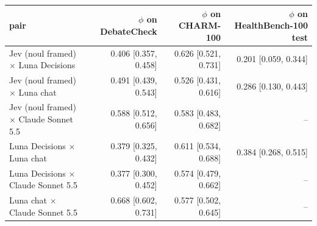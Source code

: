 \begin{tabular}{lrrr}
\toprule
pair & $\phi$ on DebateCheck & $\phi$ on CHARM-100 & $\phi$ on HealthBench-100 test \\
\midrule
Jev (noul framed) $\times$ Luna Decisions & 0.406 [0.357, 0.458] & 0.626 [0.521, 0.731] & 0.201 [0.059, 0.344] \\
Jev (noul framed) $\times$ Luna chat & 0.491 [0.439, 0.543] & 0.526 [0.431, 0.616] & 0.286 [0.130, 0.443] \\
Jev (noul framed) $\times$ Claude Sonnet 5.5 & 0.588 [0.512, 0.656] & 0.583 [0.483, 0.682] & -- \\
Luna Decisions $\times$ Luna chat & 0.379 [0.325, 0.432] & 0.611 [0.534, 0.688] & 0.384 [0.268, 0.515] \\
Luna Decisions $\times$ Claude Sonnet 5.5 & 0.377 [0.300, 0.452] & 0.574 [0.479, 0.662] & -- \\
Luna chat $\times$ Claude Sonnet 5.5 & 0.668 [0.602, 0.731] & 0.577 [0.502, 0.645] & -- \\
\bottomrule
\end{tabular}
